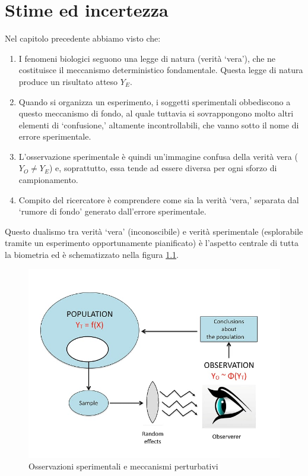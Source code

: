 \documentclass[a4paper,12pt,oneside]{book}
\providecommand{\tightlist}{%
  \setlength{\itemsep}{0pt}\setlength{\parskip}{0pt}}
\begin{document}
\hypertarget{stime-ed-incertezza}{%
\chapter{Stime ed incertezza}\label{stime-ed-incertezza}}

Nel capitolo precedente abbiamo visto che:

\begin{enumerate}
\def\labelenumi{\arabic{enumi}.}
\tightlist
\item
  I fenomeni biologici seguono una legge di natura (verità `vera'), che ne costituisce il meccanismo deterministico fondamentale. Questa legge di natura produce un risultato atteso \(Y_E\).
\item
  Quando si organizza un esperimento, i soggetti sperimentali obbediscono a questo meccanismo di fondo, al quale tuttavia si sovrappongono molto altri elementi di `confusione,' altamente incontrollabili, che vanno sotto il nome di errore sperimentale.
\item
  L'osservazione sperimentale è quindi un'immagine confusa della verità vera (\(Y_O \neq Y_E\)) e, soprattutto, essa tende ad essere diversa per ogni sforzo di campionamento.
\item
  Compito del ricercatore è comprendere come sia la verità `vera,' separata dal `rumore di fondo' generato dall'errore sperimentale.
\end{enumerate}

Questo dualismo tra verità `vera' (inconoscibile) e verità sperimentale (esplorabile tramite un esperimento opportunamente pianificato) è l'aspetto centrale di tutta la biometria ed è schematizzato nella figura \ref{fig:figName61}.

\begin{figure}

{\centering \includegraphics[width=0.75\linewidth]{_images/InferenceProcess} 

}

\caption{Osservazioni sperimentali e meccanismi perturbativi}\label{fig:figName61}
\end{figure}
\end{document}
